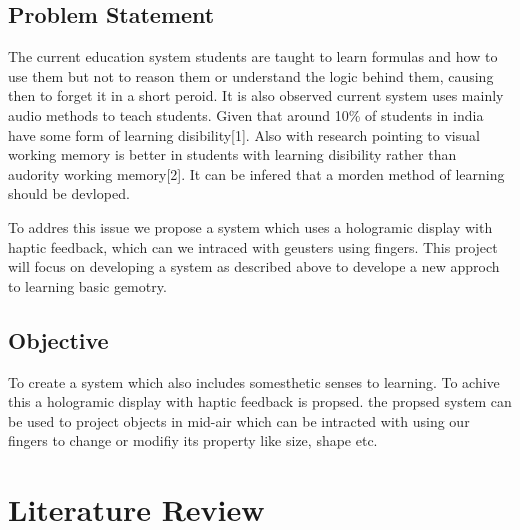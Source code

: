 \documentclass{fisatproject}
\begin{document}
\section{Problem Statement}

\par The current education system students are taught to learn formulas and how to use them but not to reason them or understand the logic behind them, causing then to forget it in a short peroid.
It is also observed current system  uses mainly audio methods to teach students.
Given that around 10\% of students in india have some form of learning disibility[1]. Also with research pointing to visual working memory is better in students with learning disibility rather than audority working memory[2].
It can be infered that a morden method of learning should be devloped.

\par To addres this issue  we propose a system which uses a hologramic display with haptic feedback, which can we intraced with geusters using fingers. This project will focus on developing a system as described above to develope a new approch to learning basic gemotry.

\section{Objective}

To create a system which also includes somesthetic senses to learning. To achive this a hologramic display with haptic feedback is propsed. the propsed system can be used to project objects in mid-air which can be intracted with using our fingers to change or modifiy its property like size, shape etc.

\chapter{Literature Review}
\end{document}
